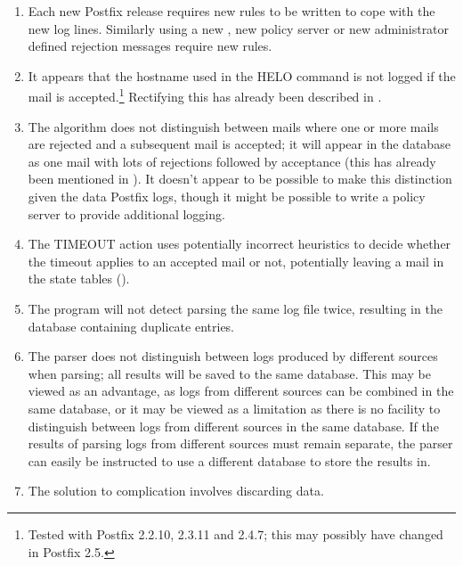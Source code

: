 \begin{enumerate}

    \item Each new Postfix release requires new rules to be written to cope
        with the new log lines.  Similarly using a new \RBL{}, new policy
        server or new administrator defined rejection messages require new
        rules.

    \item It appears that the hostname used in the HELO command is not
        logged if the mail is accepted.\footnote{Tested with Postfix
        2.2.10, 2.3.11 and 2.4.7; this may possibly have changed in Postfix
        2.5.}  Rectifying this has already been described in
        .

    \item The algorithm does not distinguish between mails where one or
        more mails are rejected and a subsequent mail is accepted; it will
        appear in the database as one mail with lots of rejections followed
        by acceptance (this has already been mentioned in
        ).  It doesn't appear to be possible
        to make this distinction given the data Postfix logs, though it
        might be possible to write a policy server to provide additional
        logging.

    \item The TIMEOUT action uses potentially incorrect heuristics to
        decide whether the timeout applies to an accepted mail or not,
        potentially leaving a mail in the state tables
        ().

    \item The program will not detect parsing the same log file twice,
        resulting in the database containing duplicate entries.

    \item The parser does not distinguish between logs produced by
        different sources when parsing; all results will be saved to the
        same database.  This may be viewed as an advantage, as logs from
        different sources can be combined in the same database, or it may
        be viewed as a limitation as there is no facility to distinguish
        between logs from different sources in the same database.  If the
        results of parsing logs from different sources must remain
        separate, the parser can easily be instructed to use a different
        database to store the results in.

    \item The solution to complication  involves discarding data.

\end{enumerate}

